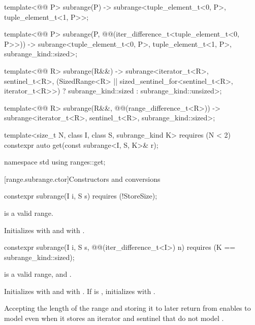 \begin{codeblock}
{  template<@@ P>
    subrange(P) -> subrange<tuple_element_t<0, P>, tuple_element_t<1, P>>;

  template<@@ P>
    subrange(P, @@(iter_difference_t<tuple_element_t<0, P>>)) ->
      subrange<tuple_element_t<0, P>, tuple_element_t<1, P>, subrange_kind::sized>;

  template<@@ R>
    subrange(R&&) ->
      subrange<iterator_t<R>, sentinel_t<R>,
               (SizedRange<R> || sized_sentinel_for<sentinel_t<R>, iterator_t<R>>)
                 ? subrange_kind::sized : subrange_kind::unsized>;

  template<@@ R>
    subrange(R&&, @@(range_difference_t<R>)) ->
      subrange<iterator_t<R>, sentinel_t<R>, subrange_kind::sized>;

  template<size_t N, class I, class S, subrange_kind K>
    requires (N < 2)
  constexpr auto get(const subrange<I, S, K>& r);
}

namespace std {
  using ranges::get;
}
\end{codeblock}

[range.subrange.ctor]{Constructors and conversions}

%
\begin{itemdecl}
constexpr subrange(I i, S s) requires (!StoreSize);
\end{itemdecl}

\begin{itemdescr}
\pnum
\expects {} is a valid range.

\pnum
\effects Initializes  with  and  with
.
\end{itemdescr}

%
\begin{itemdecl}
constexpr subrange(I i, S s, @@(iter_difference_t<I>) n)
  requires (K == subrange_kind::sized);
\end{itemdecl}

\begin{itemdescr}
\pnum
\expects {} is a valid range, and
.

\pnum
\effects Initializes  with  and  with
. If  is , initializes  with
.

\pnum
\begin{note}
Accepting the length of the range and storing it to later return  from
 enables  to model  even
when it stores an iterator and sentinel that do not model
.
\end{note}
\end{itemdescr}

